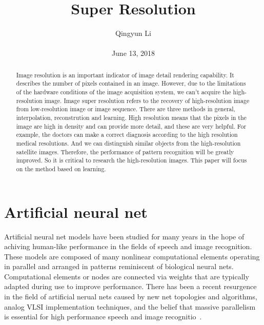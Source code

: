 \documentclass[10pt,twocolumn,letterpaper]{article}
\begin{document}
\author{Qingyun Li\\\\
June 13, 2018}        
\title{Super Resolution}

\maketitle

\begin{abstract}
 \par
  Image resolution is an important indicator of image detail rendering capability. It describes the number of pixels contained in an image. However, due to the limitations of the hardware conditions of the image acquisition system, we can't acquire the high-resolution image. Image super resolution refers to the recovery of high-resolution image from low-resolution image or image sequence. There are three methods in general, interpolation, reconstrution and learning.  High resolution means that the pixels in the image are high in density and can provide more detail, and these are very helpful. For example, the doctors can make a correct diagnosis according to the high resolution medical resolutions. And we can distinguish similar objects from the high-resolution satellite images. Therefore, the performance of pattern recognition will be greatly improved. So it is critical to research the high-resolution images. This paper will focus on the method based on learning.
\end{abstract}
\section{Artificial neural net}
 \par Artificial neural net models have been studied for many years in the hope of achiving human-like performance in the fields of speech and image recognition. These models are composed of many nonlinear computational elements operating in parallel and arranged in patterns reminiscent of biological neural nets. Computational elements or nodes are connected via weights that are typically adapted during use to improve performance. There has been a recent resurgence in the field of artificial nerual nets caused by new net topologies and algorithms, analog VLSI implementation techniques, and the belief that massive parallelism is essential for high performance speech and image recognitio~\cite{lippmann1987introduction}.
\end{document}
